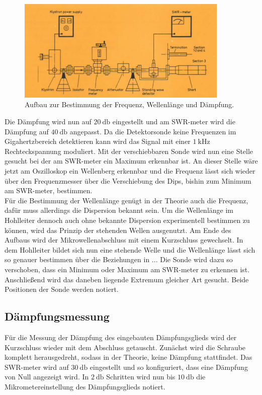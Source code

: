 \begin{figure}
    \centering
    \includegraphics[width=0.9\textwidth]{bilder/aufbau2.png}
    \caption{Aufbau zur Bestimmung der Frequenz, Wellenlänge und Dämpfung. \cite{skript}} 
    \label{fig:2}
\end{figure}
Die Dämpfung wird nun auf $\SI{20}{\decibel}$ eingestellt und am SWR-meter wird die Dämpfung auf $\SI{40}{\decibel}$ angepasst. Da die Detektorsonde keine Frequenzen im Gigahertzbereich detektieren kann wird das Signal mit einer $\SI{1}{\kilo\hertz}$ Rechteckspannung
moduliert. Mit der verschiebbaren Sonde wird nun eine Stelle gesucht bei der am SWR-meter ein Maximum erkennbar ist. An dieser Stelle wäre jetzt am Oszilloskop ein Wellenberg erkennbar und die Frequenz lässt sich wieder über den Frequenzmesser
über die Verschiebung des Dips, bishin zum Minimum am SWR-meter, bestimmen.
\\
\newline
Für die Bestimmung der Wellenlänge genügt in der Theorie auch die Frequenz, dafür muss allerdings die Dispersion bekannt sein. Um die Wellenlänge im Hohlleiter dennoch auch ohne bekannte Dispersion
experimentell bestimmen zu können, wird das Prinzip der stehenden Wellen ausgenutzt. Am Ende des Aufbaus wird der Mikrowellenabschluss mit einem Kurzschluss gewechselt. In dem Hohlleiter bildet sich nun eine stehende Welle
und die Wellenlänge lässt sich so genauer bestimmen über die Beziehungen in ...
Die Sonde wird dazu so verschoben, dass ein Minimum oder Maximum am SWR-meter zu erkennen ist. Anschließend wird das daneben liegende Extremum gleicher Art gesucht. Beide Positionen der Sonde werden notiert.

\subsection{Dämpfungsmessung}
Für die Messung der Dämpfung des eingebauten Dämpfungsglieds wird der Kurzschluss wieder mit dem Abschluss getauscht. Zunächst wird die Schraube komplett herausgedreht, sodass in der Theorie, keine Dämpfung stattfindet. Das SWR-meter wird auf 
$\SI{30}{\decibel}$ eingestellt und
so konfiguriert, dass eine Dämpfung von Null angezeigt wird. In $\SI{2}{\decibel}$ Schritten wird nun bis $\SI{10}{\decibel}$ die Mikrometereinstellung des Dämpfungsglieds notiert.

